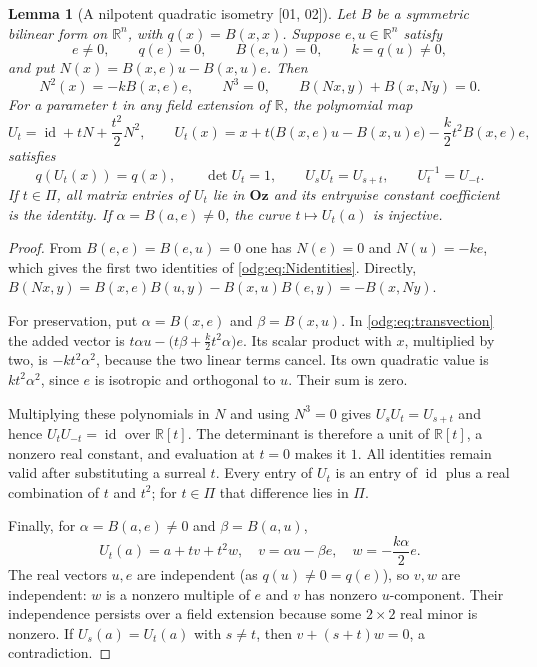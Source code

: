\documentclass[11pt,oneside]{article}
\numberwithin{equation}{section}
\newtheorem{lemma}[lemma]{Lemma}
\theoremstyle{definition}
\theoremstyle{remark}
\newcommand{\Oz}{\mathbf{Oz}}
\newcommand{\R}{\mathbb R}
\newcommand{\id}{\operatorname{id}}
\newcommand{\src}[1]{\textup{\textsf{\small[#1]}}}
\begin{document}
\begin{lemma}[A nilpotent quadratic isometry \src{01, 02}]\label{odg:lem:transvection}
Let $B$ be a symmetric bilinear form on $\R^n$, with $q(x)=B(x,x)$. Suppose
$e,u\in\R^n$ satisfy
\[
 e\ne0,\qquad q(e)=0,\qquad B(e,u)=0,\qquad k=q(u)\ne0,
\]
and put $N(x)=B(x,e)u-B(x,u)e$. Then
\begin{equation}\label{odg:eq:Nidentities}
 N^2(x)=-kB(x,e)e,\qquad N^3=0,\qquad B(Nx,y)+B(x,Ny)=0.
\end{equation}
For a parameter $t$ in any field extension of $\R$, the polynomial map
\begin{equation}\label{odg:eq:transvection}
 U_t=\id+tN+\frac{t^2}{2}N^2,\qquad
 U_t(x)=x+t\bigl(B(x,e)u-B(x,u)e\bigr)-\frac{k}{2}t^2B(x,e)e,
\end{equation}
satisfies
\[
 q(U_t(x))=q(x),\qquad \det U_t=1,\qquad U_sU_t=U_{s+t},\qquad
 U_t^{-1}=U_{-t}.
\]
If $t\in\Pi$, all matrix entries of $U_t$ lie in $\Oz$ and its entrywise
constant coefficient is the identity. If $\alpha=B(a,e)\ne0$, the curve
$t\mapsto U_t(a)$ is injective.
\end{lemma}
\begin{proof}
From $B(e,e)=B(e,u)=0$ one has $N(e)=0$ and $N(u)=-ke$, which gives the
first two identities of \eqref{odg:eq:Nidentities}. Directly,
$B(Nx,y)=B(x,e)B(u,y)-B(x,u)B(e,y)=-B(x,Ny)$.

For preservation, put $\alpha=B(x,e)$ and $\beta=B(x,u)$. In
\eqref{odg:eq:transvection} the added vector is
$t\alpha u-\bigl(t\beta+\tfrac{k}{2}t^2\alpha\bigr)e$. Its scalar product with
$x$, multiplied by two, is $-kt^2\alpha^2$, because the two linear terms
cancel. Its own quadratic value is $kt^2\alpha^2$, since $e$ is isotropic and
orthogonal to $u$. Their sum is zero.

Multiplying these polynomials in $N$ and using $N^3=0$ gives
$U_sU_t=U_{s+t}$ and hence $U_tU_{-t}=\id$ over $\R[t]$. The determinant is
therefore a unit of $\R[t]$, a nonzero real constant, and evaluation at $t=0$
makes it $1$. All identities remain valid after substituting a surreal $t$.
Every entry of $U_t$ is an entry of $\id$ plus a real combination of $t$ and
$t^2$; for $t\in\Pi$ that difference lies in $\Pi$.

Finally, for $\alpha=B(a,e)\ne0$ and $\beta=B(a,u)$,
\[
 U_t(a)=a+t v+t^2 w,
 \quad v=\alpha u-\beta e,
 \quad w=-\frac{k\alpha}{2}e .
\]
The real vectors $u,e$ are independent (as $q(u)\ne0=q(e)$), so $v,w$ are
independent: $w$ is a nonzero multiple of $e$ and $v$ has nonzero
$u$-component. Their independence persists over a field extension because
some $2\times2$ real minor is nonzero. If $U_s(a)=U_t(a)$ with $s\ne t$, then
$v+(s+t)w=0$, a contradiction.
\end{proof}
\end{document}
